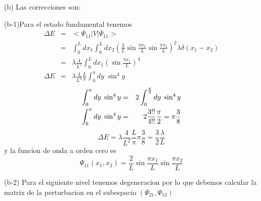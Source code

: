 (b) Las correcciones son:

(b-1)Para el estado fundamental tenemos%
\begin{eqnarray*}
\Delta E &=&<\Psi _{11}|V|\Psi _{11}> \\
&=&\int_{0}^{L}dx_{1}\int_{0}^{L}dx_{2}\left( \frac{2}{L}\sin \frac{\pi x_{1}%
}{L}\sin \frac{\pi x_{2}}{L}\right) ^{2}\lambda \delta (x_{1}-x_{2}) \\
&=&\lambda \frac{4}{L^{2}}\int_{0}^{L}dx_{1}\left( \sin \frac{\pi x_{1}}{L}%
\right) ^{4} \\
\Delta E &=&\lambda \frac{4}{L^{2}}\frac{L}{\pi }\int_{0}^{\pi }dy\;\sin
^{4}y
\end{eqnarray*}%
\begin{eqnarray*}
\int_{0}^{\pi }dy\;\sin ^{4}y &=&2\int_{0}^{\frac{\pi }{2}}dy\;\sin ^{4}y \\
\int_{0}^{\pi }dy\;\sin ^{4}y &=&2\frac{3!!}{4!!}\frac{\pi }{2}=\pi \frac{3}{%
8}
\end{eqnarray*}%
\[
\Delta E=\lambda \frac{4}{L^{2}}\frac{L}{\pi }\pi \frac{3}{8}=\frac{3}{2}%
\frac{\lambda }{L}
\]%
y la funcion de onda a orden cero es%
\[
\Psi _{11}(x_{1},x_{2})=\frac{2}{L}\sin \frac{\pi x_{1}}{L}\sin \frac{\pi
x_{2}}{L}
\]

(b-2) Para el siguiente nivel tenemos degeneracion por lo que debemos
calcular la matrix de la perturbacion en el subespacio $(\Psi _{21},\Psi
_{12})$

